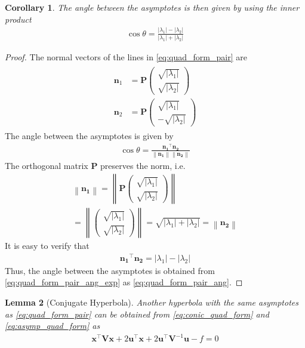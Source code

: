 \documentclass[]{interact}
\theoremstyle{plain}%
\newtheorem{theorem}{Theorem}[section]
\newtheorem{lemma}[theorem]{Lemma}
\newtheorem{corollary}[theorem]{Corollary}
\theoremstyle{definition}
\theoremstyle{remark}
\providecommand{\abs}[1]{\lvert#1\rvert}
\providecommand{\norm}[1]{\left\lVert#1\right\rVert}
\newcommand{\myvec}[1]{\ensuremath{\begin{pmatrix}#1\end{pmatrix}}}
\let\vec\mathbf
\begin{document}
\begin{corollary}
  The angle between the asymptotes is then given by using the inner product
\begin{align} 
\label{eq:quad_form_pair_ang}
\cos\theta=\frac{\abs{\lambda_1}-\abs{\lambda_2}}
{\abs{\lambda_1}+\abs{\lambda_2}}
\end{align} 
\end{corollary}
\begin{proof}
  The normal vectors of the lines in \eqref{eq:quad_form_pair} are 
  \begin{align} 
  \label{eq:quad_form_pair_normvecs}
  \begin{split}
  \vec{n}_1 &= \vec{P}\myvec{\sqrt{\abs{\lambda_1}} \\[2mm]  \sqrt{\abs{\lambda_2}}}
  \\
  \vec{n}_2 &= \vec{P}\myvec{\sqrt{\abs{\lambda_1}} \\[2mm] - \sqrt{\abs{\lambda_2}}}
  \end{split}
  \end{align} 
  The angle between the asymptotes is given by 
\begin{align} 
\label{eq:quad_form_pair_ang_exp}
\cos\theta=\frac{\vec{n_1}^{\top}\vec{n_2}}{\norm{\vec{n_1}}\norm{\vec{n_2}}}
\end{align} 
The orthogonal matrix $\vec{P}$ preserves the norm, i.e.
\begin{align} 
\norm{\vec{n_1}} = \norm{\vec{P}\myvec{\sqrt{\abs{\lambda_1}} \\[2mm]  \sqrt{\abs{\lambda_2}}}}
\\
=\norm{\myvec{\sqrt{\abs{\lambda_1}} \\[2mm]  \sqrt{\abs{\lambda_2}}}}
=\sqrt{\abs{\lambda_1}+\abs{\lambda_2}} = \norm{\vec{n_2}}
\end{align} 
It is easy to verify that 
\begin{align} 
\vec{n_1}^{\top}\vec{n_2} = \abs{\lambda_1}-\abs{\lambda_2}
\end{align} 
%
Thus, the angle between the asymptotes is obtained from \eqref{eq:quad_form_pair_ang_exp} as \eqref{eq:quad_form_pair_ang}.
\end{proof}
\begin{lemma}[Conjugate Hyperbola]
Another hyperbola with the same asymptotes as \eqref{eq:quad_form_pair} can be obtained from \eqref{eq:conic_quad_form} and \eqref{eq:asymp_quad_form} as
\begin{align}
\label{eq:hyper_conj_quad_form}
\vec{x}^{\top}\vec{V}\vec{x}+2\vec{u}^{\top}\vec{x}+2\vec{u}^{\top}\vec{V}^{-1}\vec{u}-f=0
\end{align}
\end{lemma}
\end{document}
